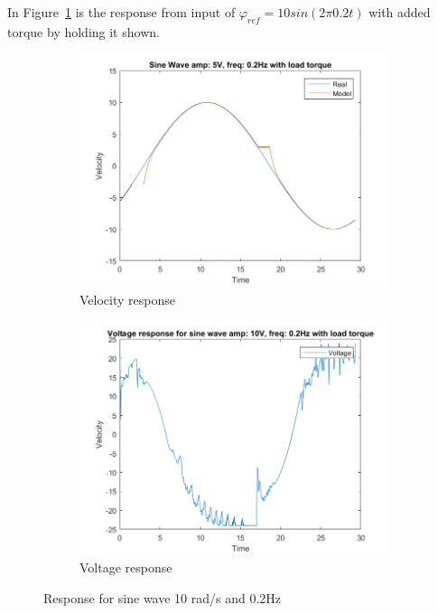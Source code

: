 \documentclass[12pt,a4paper]{article}
\begin{document}
In Figure~\ref{fig:T2_a10_f02_load:a} is the response from input of
$\varphi_{ref}=10sin(2\pi 0.2t)$ with added torque by holding it shown.
\begin{figure}[H]
  \centering
  \begin{subfigure}[b]{0.45\linewidth}
    \includegraphics[width=\linewidth]{T2_a10_f02_load.png}
    \caption{Velocity response }
    \label{fig:T2_a10_f02_load:a}
  \end{subfigure}
  \begin{subfigure}[b]{0.45\linewidth}
    \includegraphics[width=\linewidth]{T2_V_a10_f02_load.png}
    \caption{Voltage response }
    \label{fig:T2_a10_f02_load:b}
  \end{subfigure}
  \caption{Response for sine wave 10 rad/s and 0.2Hz}
  \label{fig:T2_a10_f02_load}
\end{figure}
\end{document}
